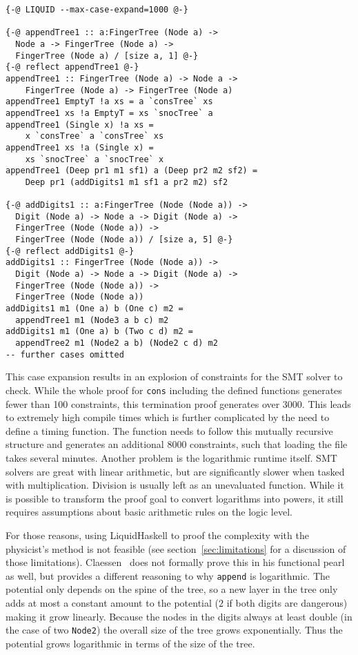 \documentclass[sigplan,screen]{acmart}
\begin{document}
\begin{lstlisting}
{-@ LIQUID --max-case-expand=1000 @-}

{-@ appendTree1 :: a:FingerTree (Node a) ->
  Node a -> FingerTree (Node a) ->
  FingerTree (Node a) / [size a, 1] @-}
{-@ reflect appendTree1 @-}
appendTree1 :: FingerTree (Node a) -> Node a ->
    FingerTree (Node a) -> FingerTree (Node a)
appendTree1 EmptyT !a xs = a `consTree` xs
appendTree1 xs !a EmptyT = xs `snocTree` a
appendTree1 (Single x) !a xs =
    x `consTree` a `consTree` xs
appendTree1 xs !a (Single x) =
    xs `snocTree` a `snocTree` x
appendTree1 (Deep pr1 m1 sf1) a (Deep pr2 m2 sf2) =
    Deep pr1 (addDigits1 m1 sf1 a pr2 m2) sf2

{-@ addDigits1 :: a:FingerTree (Node (Node a)) ->
  Digit (Node a) -> Node a -> Digit (Node a) ->
  FingerTree (Node (Node a)) ->
  FingerTree (Node (Node a)) / [size a, 5] @-}
{-@ reflect addDigits1 @-}
addDigits1 :: FingerTree (Node (Node a)) ->
  Digit (Node a) -> Node a -> Digit (Node a) ->
  FingerTree (Node (Node a)) ->
  FingerTree (Node (Node a))
addDigits1 m1 (One a) b (One c) m2 =
  appendTree1 m1 (Node3 a b c) m2
addDigits1 m1 (One a) b (Two c d) m2 =
  appendTree2 m1 (Node2 a b) (Node2 c d) m2
-- further cases omitted
\end{lstlisting}

This case expansion results in an explosion of constraints for the SMT solver to check. While the whole proof for \texttt{cons} including the defined functions generates fewer than 100 constraints, this termination proof generates over 3000. This leads to extremely high compile times which is further complicated by the need to define a timing function. The function needs to follow this mutually recursive structure and generates an additional 8000 constraints, such that loading the file takes several minutes. Another problem is the logarithmic runtime itself. SMT solvers are great with linear arithmetic, but are significantly slower when tasked with multiplication. Division is usually left as an unevaluated function. While it is possible to transform the proof goal to convert logarithms into powers, it still requires assumptions about basic arithmetic rules on the logic level.

For those reasons, using LiquidHaskell to proof the complexity with the physicist's method is not feasible (see section~\ref{sec:limitations} for a discussion of those limitations). Claessen~\cite{fingertrees_new} does not formally prove this in his functional pearl as well, but provides a different reasoning to why \texttt{append} is logarithmic. The potential only depends on the spine of the tree, so a new layer in the tree only adds at most a constant amount to the potential ($2$ if both digits are dangerous) making it grow linearly. Because the nodes in the digits always at least double (in the case of two \texttt{Node2}) the overall size of the tree grows exponentially. Thus the potential grows logarithmic in terms of the size of the tree.
\end{document}
